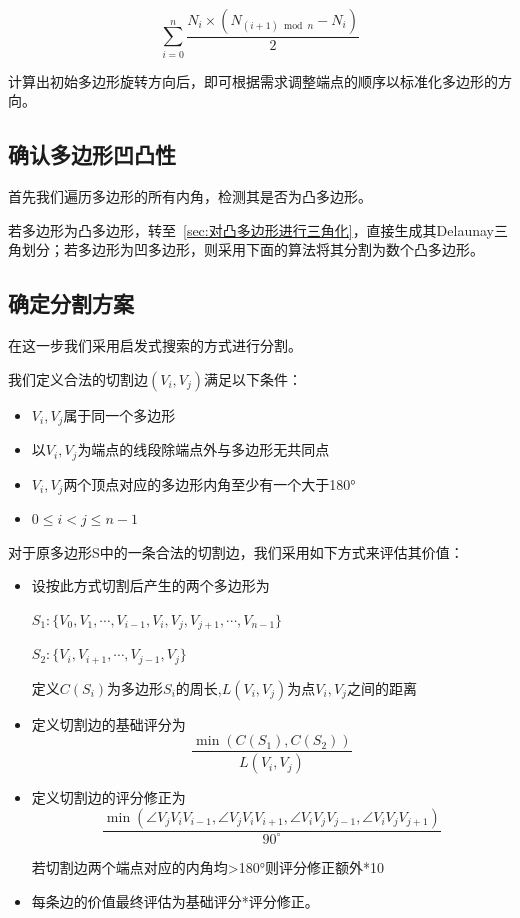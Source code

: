 \begin{equation}
\sum\limits_{i=0}^{n}{\frac{N_i\times (N_{(i+1)\bmod n}-N_i)}{2}}
\end{equation}

计算出初始多边形旋转方向后，即可根据需求调整端点的顺序以标准化多边形的方向。

\subsection{确认多边形凹凸性}
首先我们遍历多边形的所有内角，检测其是否为凸多边形。

若多边形为凸多边形，转至~\ref*{sec:对凸多边形进行三角化}，直接生成其Delaunay三角划分；若多边形为凹多边形，则采用下面的算法将其分割为数个凸多边形。
\subsection{确定分割方案}
在这一步我们采用启发式搜索的方式进行分割。

我们定义合法的切割边\(( V_i,V_j) \)满足以下条件：

\begin{itemize}
    \item \(V_i,V_j\)属于同一个多边形
    \item 以\(V_i,V_j\)为端点的线段除端点外与多边形无共同点
    \item \(V_i,V_j\)两个顶点对应的多边形内角至少有一个大于180°
    \item \(0\le i<j\le n-1\)
\end{itemize}
对于原多边形S中的一条合法的切割边，我们采用如下方式来评估其价值：

\begin{itemize}
    \item 设按此方式切割后产生的两个多边形为

    \(S_1:\{ V_0,V_1,\cdots,V_{i-1},V_i,V_j,V_{j+1},\cdots,V_{n-1}\} \)

    \(S_2:\{ V_i,V_{i+1},\cdots,V_{j-1},V_j\}\)

    定义\(C(S_i)\)为多边形\(S_i\)的周长,\quad \(L(V_i,V_j)\)为点\(V_i,V_j\)之间的距离

    \item 定义切割边的基础评分为
    \begin{equation}
        \frac {\min(C(S_1),C(S_2))}{L(V_i,V_j)}
    \end{equation}
    \item 定义切割边的评分修正为
    \begin{equation}
        \frac {\min(\angle V_jV_iV_{i-1},\angle V_jV_iV_{i+1},\angle V_iV_jV_{j-1},\angle V_iV_jV_{j+1})}{90^\circ}
    \end{equation}

    若切割边两个端点对应的内角均>180°则评分修正额外*10

    \item 每条边的价值最终评估为基础评分*评分修正。
    
\end{itemize}

